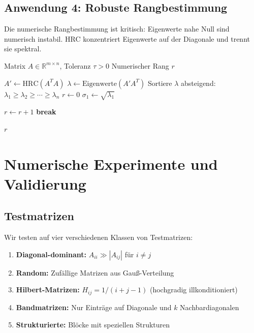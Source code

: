 \documentclass[a4paper,12pt]{article}
\theoremstyle{definition}
\begin{document}
\subsection{Anwendung 4: Robuste Rangbestimmung}

Die numerische Rangbestimmung ist kritisch: Eigenwerte nahe Null sind numerisch instabil. HRC konzentriert Eigenwerte auf der Diagonale und trennt sie spektral.

\begin{algorithm}[H]
\caption{HRC-basierte Rangbestimmung}
\begin{algorithmic}[1]
\Require Matrix $A \in \mathbb{R}^{m \times n}$, Toleranz $\tau > 0$
\Ensure Numerischer Rang $r$

\State $A' \gets \text{HRC}(A^T A)$ 
\State $\lambda \gets \text{Eigenwerte}(A'A^T)$ 
\State Sortiere $\lambda$ absteigend: $\lambda_1 \geq \lambda_2 \geq \cdots \geq \lambda_n$
\State $r \gets 0$
\State $\sigma_1 \gets \sqrt{\lambda_1}$

		\State $r \gets r + 1$
	\Else
		\State \textbf{break}
	\EndIf
\EndFor

\State \Return $r$
\end{algorithmic}
\end{algorithm}

\section{Numerische Experimente und Validierung}

\subsection{Testmatrizen}

Wir testen auf vier verschiedenen Klassen von Testmatrizen:

\begin{enumerate}
	\item \textbf{Diagonal-dominant:} $A_{ii} \gg |A_{ij}|$ für $i \neq j$
	\item \textbf{Random:} Zufällige Matrizen aus Gauß-Verteilung
	\item \textbf{Hilbert-Matrizen:} $H_{ij} = 1/(i+j-1)$ (hochgradig illkonditioniert)
	\item \textbf{Bandmatrizen:} Nur Einträge auf Diagonale und $k$ Nachbardiagonalen
	\item \textbf{Strukturierte:} Blöcke mit speziellen Strukturen
\end{enumerate}
\end{document}
